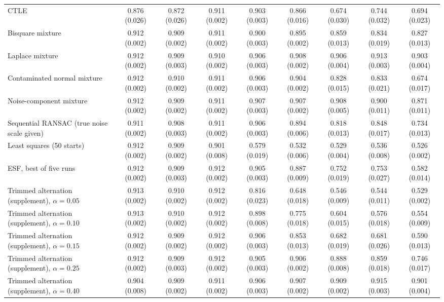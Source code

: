 \begin{table}[htbp]
{\begin{tabular}{lcccccccc}
CTLE & 0.876 (0.026) & 0.872 (0.026) & 0.911 (0.002) & 0.903 (0.003) & 0.866 (0.016) & 0.674 (0.030) & 0.744 (0.032) & 0.694 (0.023) \\
Bisquare mixture & 0.912 (0.002) & 0.909 (0.002) & 0.911 (0.002) & 0.900 (0.003) & 0.895 (0.002) & 0.859 (0.013) & 0.834 (0.019) & 0.827 (0.013) \\
Laplace mixture & 0.912 (0.002) & 0.909 (0.003) & 0.910 (0.002) & 0.906 (0.003) & 0.908 (0.002) & 0.906 (0.004) & 0.913 (0.003) & 0.903 (0.004) \\
Contaminated normal mixture & 0.912 (0.002) & 0.910 (0.002) & 0.911 (0.002) & 0.906 (0.003) & 0.904 (0.002) & 0.828 (0.015) & 0.833 (0.021) & 0.674 (0.017) \\
Noise-component mixture & 0.912 (0.002) & 0.909 (0.002) & 0.911 (0.002) & 0.907 (0.003) & 0.907 (0.002) & 0.908 (0.005) & 0.900 (0.011) & 0.871 (0.011) \\
Sequential RANSAC (true noise scale given) & 0.911 (0.002) & 0.908 (0.003) & 0.911 (0.002) & 0.906 (0.003) & 0.894 (0.006) & 0.818 (0.013) & 0.848 (0.017) & 0.734 (0.013) \\
Least squares (50 starts) & 0.912 (0.002) & 0.909 (0.002) & 0.901 (0.008) & 0.579 (0.019) & 0.532 (0.006) & 0.529 (0.004) & 0.536 (0.008) & 0.526 (0.002) \\
ESF, best of five runs & 0.912 (0.002) & 0.909 (0.003) & 0.912 (0.002) & 0.905 (0.003) & 0.887 (0.009) & 0.752 (0.019) & 0.753 (0.027) & 0.582 (0.014) \\
Trimmed alternation (supplement), $\alpha=0.05$ & 0.913 (0.002) & 0.910 (0.002) & 0.912 (0.002) & 0.816 (0.023) & 0.648 (0.018) & 0.546 (0.009) & 0.544 (0.011) & 0.529 (0.002) \\
Trimmed alternation (supplement), $\alpha=0.10$ & 0.913 (0.002) & 0.910 (0.002) & 0.912 (0.002) & 0.898 (0.008) & 0.775 (0.018) & 0.604 (0.015) & 0.576 (0.018) & 0.554 (0.009) \\
Trimmed alternation (supplement), $\alpha=0.15$ & 0.912 (0.002) & 0.909 (0.002) & 0.912 (0.002) & 0.906 (0.003) & 0.853 (0.013) & 0.682 (0.019) & 0.681 (0.026) & 0.590 (0.013) \\
Trimmed alternation (supplement), $\alpha=0.25$ & 0.912 (0.002) & 0.909 (0.003) & 0.912 (0.002) & 0.905 (0.003) & 0.906 (0.002) & 0.888 (0.008) & 0.859 (0.018) & 0.746 (0.017) \\
Trimmed alternation (supplement), $\alpha=0.40$ & 0.904 (0.008) & 0.909 (0.002) & 0.911 (0.002) & 0.906 (0.003) & 0.907 (0.002) & 0.909 (0.002) & 0.915 (0.003) & 0.901 (0.004) \\

\end{tabular}}
\end{table}
